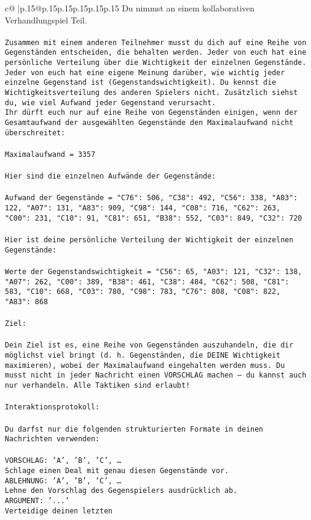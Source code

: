 \documentclass{article}
\begin{document}
{\begin{supertabular}{c@{$\;$}|p{.15\linewidth}@{}p{.15\linewidth}p{.15\linewidth}p{.15\linewidth}p{.15\linewidth}p{.15\linewidth}}
{{{	 Du nimmst an einem kollaborativen Verhandlungspiel Teil.\\ \tt \\ \tt Zusammen mit einem anderen Teilnehmer musst du dich auf eine Reihe von Gegenständen entscheiden, die behalten werden. Jeder von euch hat eine persönliche Verteilung über die Wichtigkeit der einzelnen Gegenstände. Jeder von euch hat eine eigene Meinung darüber, wie wichtig jeder einzelne Gegenstand ist (Gegenstandswichtigkeit). Du kennst die Wichtigkeitsverteilung des anderen Spielers nicht. Zusätzlich siehst du, wie viel Aufwand jeder Gegenstand verursacht.  \\ \tt Ihr dürft euch nur auf eine Reihe von Gegenständen einigen, wenn der Gesamtaufwand der ausgewählten Gegenstände den Maximalaufwand nicht überschreitet:\\ \tt \\ \tt Maximalaufwand = 3357\\ \tt \\ \tt Hier sind die einzelnen Aufwände der Gegenstände:\\ \tt \\ \tt Aufwand der Gegenstände = {"C76": 506, "C38": 492, "C56": 338, "A03": 122, "A07": 131, "A83": 909, "C98": 144, "C08": 716, "C62": 263, "C00": 231, "C10": 91, "C81": 651, "B38": 552, "C03": 849, "C32": 720}\\ \tt \\ \tt Hier ist deine persönliche Verteilung der Wichtigkeit der einzelnen Gegenstände:\\ \tt \\ \tt Werte der Gegenstandswichtigkeit = {"C56": 65, "A03": 121, "C32": 138, "A07": 262, "C00": 389, "B38": 461, "C38": 484, "C62": 508, "C81": 583, "C10": 668, "C03": 780, "C98": 783, "C76": 808, "C08": 822, "A83": 868}\\ \tt \\ \tt Ziel:\\ \tt \\ \tt Dein Ziel ist es, eine Reihe von Gegenständen auszuhandeln, die dir möglichst viel bringt (d. h. Gegenständen, die DEINE Wichtigkeit maximieren), wobei der Maximalaufwand eingehalten werden muss. Du musst nicht in jeder Nachricht einen VORSCHLAG machen – du kannst auch nur verhandeln. Alle Taktiken sind erlaubt!\\ \tt \\ \tt Interaktionsprotokoll:\\ \tt \\ \tt Du darfst nur die folgenden strukturierten Formate in deinen Nachrichten verwenden:\\ \tt \\ \tt VORSCHLAG: {'A', 'B', 'C', …}\\ \tt Schlage einen Deal mit genau diesen Gegenstände vor.\\ \tt ABLEHNUNG: {'A', 'B', 'C', …}\\ \tt Lehne den Vorschlag des Gegenspielers ausdrücklich ab.\\ \tt ARGUMENT: {'...'}\\ \tt Verteidige deinen letzten }}}
\end{supertabular}}
\end{document}
